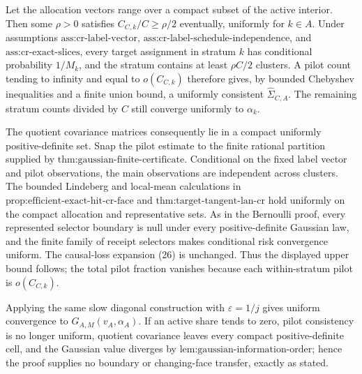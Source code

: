 Let the allocation vectors range over a compact subset of the active interior.  Then some \(\rho>0\) satisfies \(C_{C,k}/C\geq\rho/2\) eventually, uniformly for \(k\in A\).  Under assumptions \(\text{ass:cr-label-vector}\), \(\text{ass:cr-label-schedule-independence}\), and \(\text{ass:cr-exact-slices}\), every target assignment in stratum \(k\) has conditional probability \(1/M_k\), and the stratum contains at least \(\rho C/2\) clusters.  A pilot count tending to infinity and equal to \(o(C_{C,k})\) therefore gives, by bounded Chebyshev inequalities and a finite union bound, a uniformly consistent \(\widehat\Sigma_{C,A}\).  The remaining stratum counts divided by \(C\) still converge uniformly to \(\alpha_k\).

The quotient covariance matrices consequently lie in a compact uniformly positive-definite set.  Snap the pilot estimate to the finite rational partition supplied by \(\text{thm:gaussian-finite-certificate}\).  Conditional on the fixed label vector and pilot observations, the main observations are independent across clusters.  The bounded Lindeberg and local-mean calculations in \(\text{prop:efficient-exact-hit-cr-face}\) and \(\text{thm:target-tangent-lan-cr}\) hold uniformly on the compact allocation and representative sets.  As in the Bernoulli proof, every represented selector boundary is null under every positive-definite Gaussian law, and the finite family of receipt selectors makes conditional risk convergence uniform.  The causal-loss expansion (26) is unchanged.  Thus the displayed upper bound follows; the total pilot fraction vanishes because each within-stratum pilot is \(o(C_{C,k})\).

Applying the same slow diagonal construction with \(\varepsilon=1/j\) gives uniform convergence to \(G_{A,M}(v_A,\alpha_A)\).  If an active share tends to zero, pilot consistency is no longer uniform, quotient covariance leaves every compact positive-definite cell, and the Gaussian value diverges by \(\text{lem:gaussian-information-order}\); hence the proof supplies no boundary or changing-face transfer, exactly as stated.